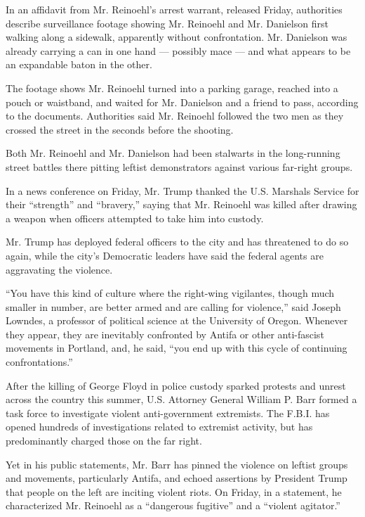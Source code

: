 In an affidavit from Mr. Reinoehl's arrest warrant, released Friday,
authorities describe surveillance footage showing Mr. Reinoehl and Mr.
Danielson first walking along a sidewalk, apparently without
confrontation. Mr. Danielson was already carrying a can in one hand ---
possibly mace --- and what appears to be an expandable baton in the
other.

The footage shows Mr. Reinoehl turned into a parking garage, reached
into a pouch or waistband, and waited for Mr. Danielson and a friend to
pass, according to the documents. Authorities said Mr. Reinoehl followed
the two men as they crossed the street in the seconds before the
shooting.

Both Mr. Reinoehl and Mr. Danielson had been stalwarts in the
long-running street battles there pitting leftist demonstrators against
various far-right groups.

In a news conference on Friday, Mr. Trump thanked the U.S. Marshals
Service for their ``strength'' and ``bravery,'' saying that Mr. Reinoehl
was killed after drawing a weapon when officers attempted to take him
into custody.

Mr. Trump has deployed federal officers to the city and has threatened
to do so again, while the city's Democratic leaders have said the
federal agents are aggravating the violence.

``You have this kind of culture where the right-wing vigilantes, though
much smaller in number, are better armed and are calling for violence,''
said Joseph Lowndes, a professor of political science at the University
of Oregon. Whenever they appear, they are inevitably confronted by
Antifa or other anti-fascist movements in Portland, and, he said, ``you
end up with this cycle of continuing confrontations.''

After the killing of George Floyd in police custody sparked protests and
unrest across the country this summer, U.S. Attorney General William P.
Barr formed a task force to investigate violent anti-government
extremists. The F.B.I. has opened hundreds of investigations related to
extremist activity, but has predominantly charged those on the far
right.

Yet in his public statements, Mr. Barr has pinned the violence on
leftist groups and movements, particularly Antifa, and echoed assertions
by President Trump that people on the left are inciting violent riots.
On Friday, in a statement, he characterized Mr. Reinoehl as a
``dangerous fugitive'' and a ``violent agitator.''

